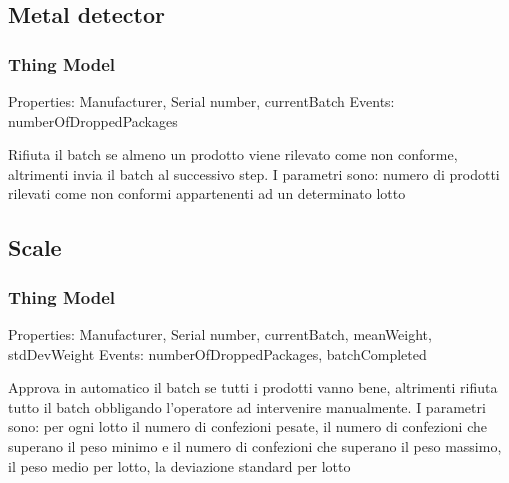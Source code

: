 \subsection{Metal detector}
\subsubsection{Thing Model}
Properties: Manufacturer, Serial number, currentBatch
Events: numberOfDroppedPackages

Rifiuta il batch se almeno un prodotto viene rilevato come non conforme, altrimenti invia il batch al successivo step.
I parametri sono:
numero di prodotti rilevati come non conformi appartenenti ad un determinato lotto

\subsection{Scale}
\subsubsection{Thing Model}
Properties: Manufacturer, Serial number, currentBatch, meanWeight, stdDevWeight
Events: numberOfDroppedPackages, batchCompleted

Approva in automatico il batch se tutti i prodotti vanno bene, altrimenti rifiuta tutto il batch obbligando l'operatore ad intervenire manualmente.
I parametri sono:
per ogni lotto il numero di confezioni pesate, il numero di confezioni che superano il peso minimo e il numero di confezioni che superano il peso massimo, il peso medio per lotto, la deviazione standard per lotto

